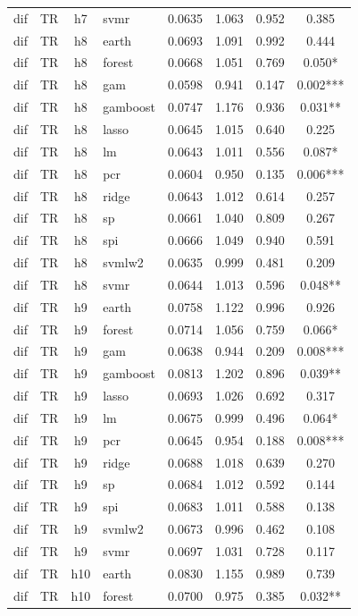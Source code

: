 \begin{ThreePartTable}
\begin{longtable}[t]{llclcccc}
dif & TR & h7 & svmr & 0.0635 & 1.063 & 0.952 & 0.385\\
\addlinespace
dif & TR & h8 & earth & 0.0693 & 1.091 & 0.992 & 0.444\\
dif & TR & h8 & forest & 0.0668 & 1.051 & 0.769 & 0.050*\\
dif & TR & h8 & gam & 0.0598 & 0.941 & 0.147 & 0.002***\\
dif & TR & h8 & gamboost & 0.0747 & 1.176 & 0.936 & 0.031**\\
dif & TR & h8 & lasso & 0.0645 & 1.015 & 0.640 & 0.225\\
dif & TR & h8 & lm & 0.0643 & 1.011 & 0.556 & 0.087*\\
dif & TR & h8 & pcr & 0.0604 & 0.950 & 0.135 & 0.006***\\
dif & TR & h8 & ridge & 0.0643 & 1.012 & 0.614 & 0.257\\
dif & TR & h8 & sp & 0.0661 & 1.040 & 0.809 & 0.267\\
dif & TR & h8 & spi & 0.0666 & 1.049 & 0.940 & 0.591\\
dif & TR & h8 & svmlw2 & 0.0635 & 0.999 & 0.481 & 0.209\\
dif & TR & h8 & svmr & 0.0644 & 1.013 & 0.596 & 0.048**\\
\addlinespace
dif & TR & h9 & earth & 0.0758 & 1.122 & 0.996 & 0.926\\
dif & TR & h9 & forest & 0.0714 & 1.056 & 0.759 & 0.066*\\
dif & TR & h9 & gam & 0.0638 & 0.944 & 0.209 & 0.008***\\
dif & TR & h9 & gamboost & 0.0813 & 1.202 & 0.896 & 0.039**\\
dif & TR & h9 & lasso & 0.0693 & 1.026 & 0.692 & 0.317\\
dif & TR & h9 & lm & 0.0675 & 0.999 & 0.496 & 0.064*\\
dif & TR & h9 & pcr & 0.0645 & 0.954 & 0.188 & 0.008***\\
dif & TR & h9 & ridge & 0.0688 & 1.018 & 0.639 & 0.270\\
dif & TR & h9 & sp & 0.0684 & 1.012 & 0.592 & 0.144\\
dif & TR & h9 & spi & 0.0683 & 1.011 & 0.588 & 0.138\\
dif & TR & h9 & svmlw2 & 0.0673 & 0.996 & 0.462 & 0.108\\
dif & TR & h9 & svmr & 0.0697 & 1.031 & 0.728 & 0.117\\
\addlinespace
dif & TR & h10 & earth & 0.0830 & 1.155 & 0.989 & 0.739\\
dif & TR & h10 & forest & 0.0700 & 0.975 & 0.385 & 0.032**\\

\end{longtable}
\end{ThreePartTable}
